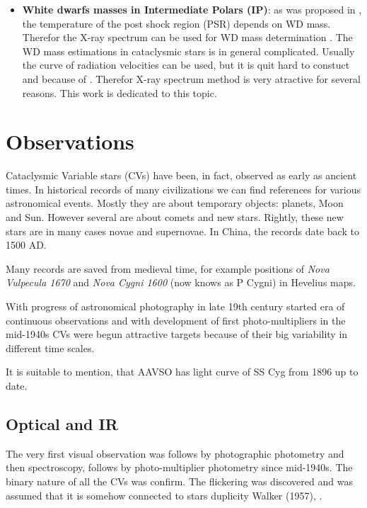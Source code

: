 \documentclass[oneside,a4paper,11pt]{report}
\begin{document}
\begin{itemize}
 \item \textbf{White dwarfs masses in Intermediate Polars (IP)}: as was proposed in \citet{1981ApJ...250..723R}, 
the temperature of the post shock region (PSR) depends on WD mass. Therefor the X-ray spectrum can be 
used for WD mass determination \citet{2005A&A...435..191S}. The WD mass estimations in cataclysmic stars 
is in general complicated. Usually the curve of radiation velocities can be used, but it is quit hard to constuct and
because of . 
Therefor X-ray spectrum method is very atractive for several reasons. This work is dedicated to this topic.  

\end{itemize}





\section{Observations}
Cataclysmic Variable stars (CVs) have been, in fact, observed as early as ancient times. In historical 
records of  many civilizations we can find references for various astronomical events. Mostly they are 
about temporary objects: planets, Moon and Sun. However several are about comets and new stars. Rightly, 
these new stars are in many cases novae and supernovae. In China, the records date back to 1500 AD. 

Many records are saved from medieval time, for example positions of \textit{Nova Vulpecula 1670} and 
\textit{Nova Cygni 1600} (now knows as P Cygni) in Hevelius maps. 

With progress of astronomical photography in late 19th century started era of continuous observations
and with  development of first photo-multipliers in the mid-1940s CVs were begun attractive 
targets because of their big variability in different time scales. 

It is suitable to mention, that AAVSO has light curve of SS Cyg from 1896 up to date. 
\subsection{Optical and IR}
The very first visual observation was follows by photographic photometry and then spectroscopy, 
follows by photo-multiplier photometry since mid-1940s. The binary nature of all the CVs was confirm. 
The flickering was discovered and was assumed that it is somehow connected to stars duplicity Walker (1957),
\citet{warner:1}.
\end{document}
